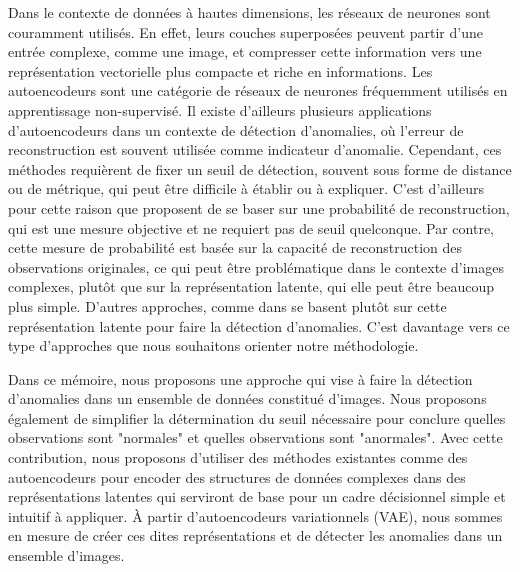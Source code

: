 Dans le contexte de données à hautes dimensions, les réseaux de neurones sont couramment utilisés. En effet, leurs couches superposées peuvent partir d'une entrée complexe, comme une image, et compresser cette information vers une représentation vectorielle plus compacte et riche en informations. Les autoencodeurs sont une catégorie de réseaux de neurones fréquemment utilisés en apprentissage non-supervisé. Il existe d'ailleurs plusieurs applications d'autoencodeurs dans un contexte de détection d'anomalies, où l'erreur de reconstruction est souvent utilisée comme indicateur d'anomalie. Cependant, ces méthodes requièrent de fixer un seuil de détection, souvent sous forme de distance ou de métrique, qui peut être difficile à établir ou à expliquer. C'est d'ailleurs pour cette raison que  \cite{An2015VariationalAB} proposent de se baser sur une probabilité de reconstruction, qui est une mesure objective et ne requiert pas de seuil quelconque. Par contre, cette mesure de probabilité est basée sur la capacité de reconstruction des observations originales, ce qui peut être problématique dans le contexte d'images complexes, plutôt que sur la représentation latente, qui elle peut être beaucoup plus simple. D'autres approches, comme dans \cite{DBLP:journals/corr/abs-1802-06360} se basent plutôt sur cette représentation latente pour faire la détection d'anomalies. C'est davantage vers ce type d'approches que nous souhaitons orienter notre méthodologie. 

Dans ce mémoire, nous proposons une approche qui vise à faire la détection d'anomalies dans un ensemble de données constitué d'images. Nous proposons également de simplifier la détermination du seuil nécessaire pour conclure quelles observations sont "normales" et quelles observations sont "anormales". Avec cette contribution, nous proposons d'utiliser des méthodes existantes comme des autoencodeurs  pour encoder des structures de données complexes dans des représentations latentes qui serviront de base pour un cadre décisionnel simple et intuitif à appliquer. À partir d'autoencodeurs variationnels (VAE), nous sommes en mesure de créer ces dites représentations et de détecter les anomalies dans un ensemble d'images.